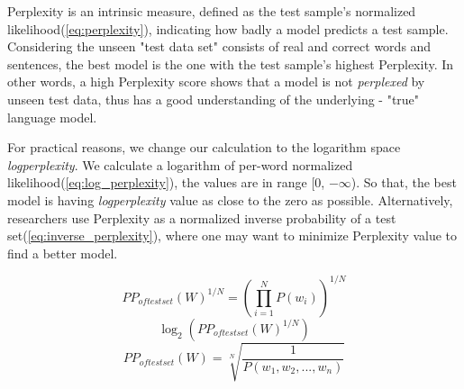 \documentclass[12pt,journal,letterpaper,oneside,onecolumn]{IEEEtran}
\begin{document}
Perplexity is an intrinsic measure, defined as the test sample's normalized likelihood(\ref{eq:perplexity}), indicating how badly a model predicts a test sample. Considering the unseen "test data set" consists of real and correct words and sentences, the best model is the one with the test sample's highest Perplexity. In other words, a high Perplexity score shows that a model is not \textit{perplexed} by unseen test data, thus has a good understanding of the underlying - "true" language model.

For practical reasons, we change our calculation to the logarithm space \textit{log\textunderscore perplexity}. We calculate a logarithm of per-word normalized likelihood(\ref{eq:log_perplexity}), the values are in range [0, $-\infty$). So that, the best model is having \textit{log\textunderscore perplexity} value as close to the zero as possible. Alternatively, researchers use Perplexity as a normalized inverse probability of a test set(\ref{eq:inverse_perplexity}), where one may want to minimize Perplexity value to find a better model.

\begin{equation}
    \label{eq:perplexity}
    PP_{of test set}(W)^{1/N} = (\prod_{i=1}^{N} P(w_i))^{1/N}
\end{equation}
\begin{equation}
    \label{eq:log_perplexity}
    \log_2 (PP_{of test set}(W)^{1/N})
\end{equation}
\begin{equation}
    \label{eq:inverse_perplexity}
    PP_{of test set}(W) = \sqrt[N]{\frac{1}{P(w_1, w_2, ... , w_n)}}
\end{equation}
\end{document}

